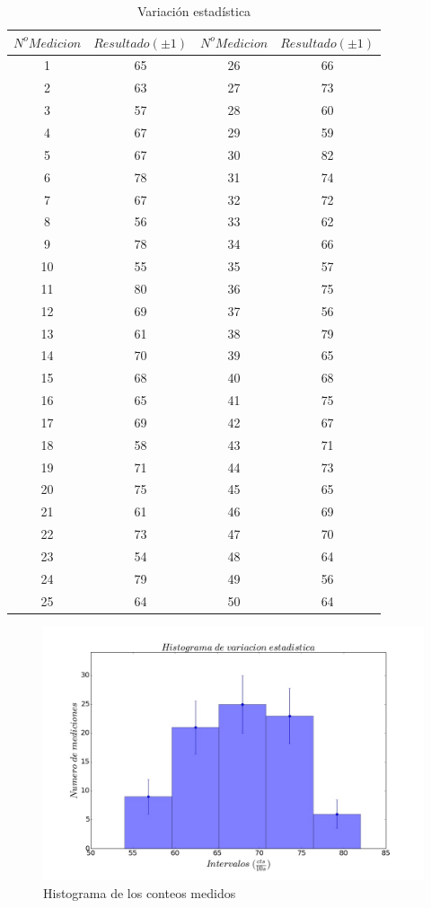 \documentclass[%
 reprint,
 amsmath,amssymb,
 aps,
]{revtex4-1}
\begin{document}
\begin{table}[h!]
\centering
\begin{tabular}{|c|c|c|c|}
	\hline $ N^oMedicion $ & $Resultado(\pm 1)$ & $ N^oMedicion $ & $Resultado(\pm 1)$ \\ 
	\hline\hline
	1&65&26&66\\
	2&63&27&73\\
	3&57&28&60\\
	4&67&29&59\\
	5&67&30&82\\
	6&78&31&74\\
	7&67&32&72\\
	8&56&33&62\\
	9&78&34&66\\
	10&55&35&57\\
	11&80&36&75\\
	12&69&37&56\\
	13&61&38&79\\
	14&70&39&65\\
	15&68&40&68\\
	16&65&41&75\\
	17&69&42&67\\
	18&58&43&71\\
	19&71&44&73\\
	20&75&45&65\\
	21&61&46&69\\
	22&73&47&70\\
	23&54&48&64\\
	24&79&49&56\\
	25&64&50&64\\	
		[1ex] 
 \hline
 \end{tabular} 
  \caption{Variación estadística}
\label{table:variaciones} 
\end{table}


\begin{figure}[h!]
\centering
\includegraphics[width=1\linewidth]{variacion.jpg}
\caption{Histograma de los conteos medidos}
\label{fig:variaciones}
\end{figure}
\end{document}
